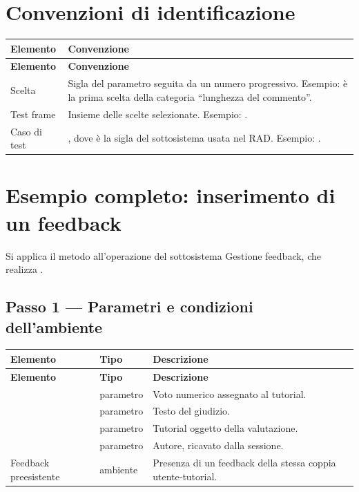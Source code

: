 \section{Convenzioni di identificazione}

\begin{longtable}{@{}L{3.4cm} L{11.0cm}@{}}
\toprule
\textbf{Elemento} & \textbf{Convenzione} \\
\midrule
\endfirsthead
\toprule
\textbf{Elemento} & \textbf{Convenzione} \\
\midrule
\endhead
\bottomrule
\endlastfoot

Scelta &
Sigla del parametro seguita da un numero progressivo. Esempio:  è la
prima scelta della categoria \enquote{lunghezza del commento}. \\

Test frame &
Insieme delle scelte selezionate. Esempio:
. \\

Caso di test &
, dove  è la sigla del sottosistema
usata nel RAD. Esempio: . \\

\end{longtable}

\section{Esempio completo: inserimento di un feedback}
\label{sec:td-esempio}

Si applica il metodo all'operazione
 del sottosistema Gestione
feedback, che realizza .

\subsection{Passo 1 — Parametri e condizioni dell'ambiente}

\begin{longtable}{@{}L{3.4cm} L{4.0cm} L{7.0cm}@{}}
\toprule
\textbf{Elemento} & \textbf{Tipo} & \textbf{Descrizione} \\
\midrule
\endfirsthead
\toprule
\textbf{Elemento} & \textbf{Tipo} & \textbf{Descrizione} \\
\midrule
\endhead
\bottomrule
\endlastfoot

 & parametro & Voto numerico assegnato al tutorial. \\
 & parametro & Testo del giudizio. \\
 & parametro & Tutorial oggetto della valutazione. \\
 & parametro & Autore, ricavato dalla sessione. \\
Feedback preesistente & ambiente &
Presenza di un feedback della stessa coppia utente-tutorial. \\

\end{longtable}

